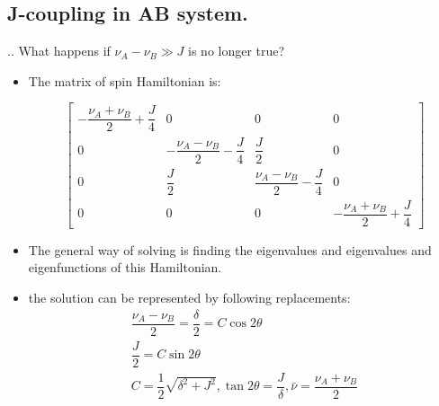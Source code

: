 \documentclass[handout]{beamer}
\begin{document}
\subsection{J-coupling in AB system.}
\begin{frame}{\thesection.\thesubsection. \insertsubsection}
	What happens if $\nu_A - \nu_B \gg J$ is no longer true?
	
	\begin{itemize}[<+>]
		\item 
		The matrix of spin Hamiltonian is:
		
			
			{\tiny
				\begin{equation}				
				\begin{bmatrix}
				-\dfrac{\nu_A+ \nu_{B}  }{2} + \dfrac{J}{4}   & 0 & 0 & 0 \\
				0 & -\dfrac{\nu_A-\nu_B}{2} - \dfrac{J}{4}  & \dfrac{J}{2} & 0 \\
				0 & \dfrac{J}{2} & \dfrac{\nu_A-\nu_B}{2} - \dfrac{J}{4}  & 0 \\
				0 & 0 & 0 & -\dfrac{\nu_A+\nu_B}{2} + \dfrac{J}{4}                  
				\end{bmatrix}
				\end{equation}
			}%
		\item The general way of solving is finding the eigenvalues and eigenvalues and eigenfunctions of this Hamiltonian.
		\item
		the solution can be represented by following replacements:
		\begin{equation}
		\begin{array}{l}
		\dfrac{\nu_A - \nu_B}{2} = \dfrac{\delta}{2} = C \cos 2\theta \\
		\dfrac{J}{2} = C \sin 2\theta \\
		C = \dfrac{1}{2}\sqrt{\delta^2 + J^2}, \tan 2\theta = \dfrac{J}{\delta}, \bar{\nu} = \dfrac{\nu_A + \nu_B}{2}
		\end{array}
		\end{equation}
	\end{itemize}
\end{frame}
\end{document}
